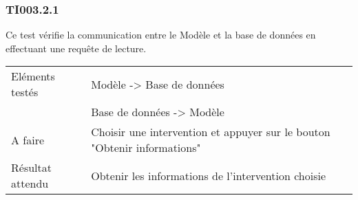 
\subsubsection{TI003.2.1}
  		Ce test vérifie la communication entre le Modèle et la base de données en effectuant une requête de lecture.
  		\begin{center}
    	 		\begin{tabular}[h]{|p{}|p{}|}
			\hline
				Eléments testés & Modèle -> Base de données  \\
							    &  Base de données -> Modèle \\\hline
    				A faire & Choisir une intervention et appuyer sur le bouton "Obtenir informations" \\\hline
    				Résultat attendu & Obtenir les informations de l'intervention choisie \\\hline
     		\end{tabular}
  		\end{center}	